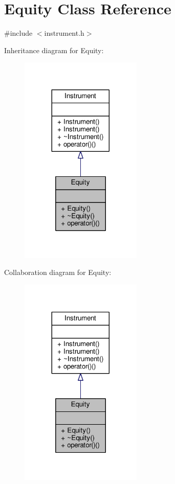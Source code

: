 \hypertarget{classEquity}{}\section{Equity Class Reference}
\label{classEquity}


{\ttfamily \#include $<$instrument.\+h$>$}



Inheritance diagram for Equity\+:
\nopagebreak
\begin{figure}[H]
\begin{center}
\leavevmode
\includegraphics[width=164pt]{classEquity__inherit__graph}
\end{center}
\end{figure}


Collaboration diagram for Equity\+:
\nopagebreak
\begin{figure}[H]
\begin{center}
\leavevmode
\includegraphics[width=164pt]{classEquity__coll__graph}
\end{center}
\end{figure}
